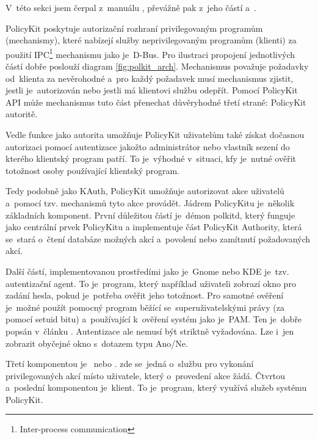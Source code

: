 V~této sekci jsem čerpal z~manuálu \cite{manpolkit_overview}, převážně pak z~jeho částí \cite{manpolkit1} a~\cite{manpklocalauth}.

PolicyKit poskytuje autorizační rozhraní privilegovaným programům (mechanismy), které nabízejí služby neprivilegovaným programům (klienti) za použití IPC\footnote{Inter-process communication} mechanismu jako je~D-Bus. Pro ilustraci propojení jednotlivých částí dobře poslouží diagram \ref{fig:polkit_arch}. Mechanismus považuje požadavky od~klienta za nevěrohodné a~pro každý požadavek musí mechanismus zjistit, jestli je~autorizován nebo jestli má klientovi službu odepřít. Pomocí PolicyKit API může mechanismus tuto část přenechat důvěryhodné třetí straně: PolicyKit autoritě.\cite{manpolkit1}

Vedle funkce jako autorita umožňuje PolicyKit uživatelům také získat dočasnou autorizaci pomocí autentizace jakožto administrátor nebo vlastník sezení do kterého klientský program patří. To je~výhodné v~situaci, kfy je~nutné ověřit totožnost osoby používající klientský program.\cite{manpolkit1}

Tedy podobně jako KAuth, PolicyKit umožňuje autorizovat akce uživatelů a~pomocí tzv. mechanismů tyto akce provádět. Jádrem PolicyKitu je~několik základních komponent. První důležitou částí je~démon polkitd, který funguje jako centrální prvek PolicyKitu a implementuje část PolicyKit Authority, která se~stará o~čtení databáze možných akcí a~povolení nebo zamítnutí požadovaných akcí.

Další částí, implementovanou prostředími jako je~Gnome nebo KDE je~tzv. autentizační agent. To je~program, který například uživateli zobrazí okno pro zadání hesla, pokud je~potřeba ověřit jeho totožnost. Pro samotné ověření je~možné použít pomocný program běžící se~superuživatelskými právy (za pomocí setuid bitu) a~používající k~ověření systém jako je~PAM. Ten je~dobře popsán v~článku \cite{rootpam}. Autentizace ale nemusí být striktně vyžadována. Lze i~jen zobrazit obyčejné okno s~dotazem typu Ano/Ne.

Třetí komponentou je~ nebo . zde se~jedná o~službu pro vykonání privilegovaných akcí místo uživatele, který o~provedení akce žádá. Čtvrtou a~poslední komponentou je~klient. To je~program, který využívá služeb systému PolicyKit.



